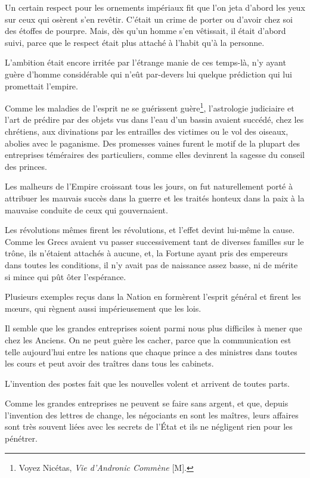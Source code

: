 \documentclass[french,twoside]{book} %
\begin{document}
Un certain respect pour les ornements impériaux fit que l’on jeta d’abord les yeux sur ceux qui osèrent s’en revêtir. C’était un crime de porter ou d’avoir chez soi des étoffes de pourpre. Mais, dès qu’un homme s’en vêtissait, il était d’abord suivi, parce que le respect était plus attaché à l’habit qu’à la personne.\par
L’ambition était encore irritée par l’étrange manie de ces temps-là, n’y ayant guère d’homme considérable qui n’eût par-devers lui quelque prédiction qui lui promettait l’empire.\par
Comme les maladies de l’esprit ne se guérissent guère\footnote{Voyez Nicétas, {\itshape Vie d’Andronic Commène} [M].}, l’astrologie judiciaire et l’art de prédire par des objets vus dans l’eau d’un bassin avaient succédé, chez les chrétiens, aux divinations par les entrailles des victimes ou le vol des oiseaux, abolies avec le paganisme. Des promesses vaines furent le motif de la plupart des entreprises téméraires des particuliers, comme elles devinrent la sagesse du conseil des princes.\par
Les malheurs de l’Empire croissant tous les jours, on fut naturellement porté à attribuer les mauvais succès dans la guerre et les traités honteux dans la paix à la mauvaise conduite de ceux qui gouvernaient.\par
Les révolutions mêmes firent les révolutions, et l’effet devint lui-même la cause. Comme les Grecs avaient vu passer successivement tant de diverses familles sur le trône, ils n’étaient attachés à aucune, et, la Fortune ayant pris des empereurs dans toutes les conditions, il n’y avait pas de naissance assez basse, ni de mérite si mince qui pût ôter l’espérance.\par
Plusieurs exemples reçus dans la Nation en formèrent l’esprit général et firent les mœurs, qui règnent aussi impérieusement que les lois.\par
Il semble que les grandes entreprises soient parmi nous plus difficiles à mener que chez les Anciens. On ne peut guère les cacher, parce que la communication est telle aujourd’hui entre les nations que chaque prince a des ministres dans toutes les cours et peut avoir des traîtres dans tous les cabinets.\par
L’invention des postes fait que les nouvelles volent et arrivent de toutes parts.\par
Comme les grandes entreprises ne peuvent se faire sans argent, et que, depuis l’invention des lettres de change, les négociants en sont les maîtres, leurs affaires sont très souvent liées avec les secrets de l’État et ils ne négligent rien pour les pénétrer.\par
\end{document}
